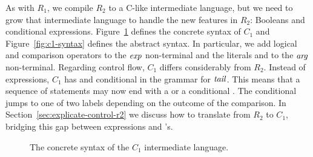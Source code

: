 \documentclass[11pt]{book}
\newcommand{\gray}[1]{{\color{lightgray} #1}}
\begin{document}
As with $R_1$, we compile $R_2$ to a C-like intermediate language, but
we need to grow that intermediate language to handle the new features
in $R_2$: Booleans and conditional expressions.
Figure~\ref{fig:c1-concrete-syntax} defines the concrete syntax of
$C_1$ and Figure~\ref{fig:c1-syntax} defines the abstract syntax.  In
particular, we add logical and comparison operators to the $\mathit{exp}$
non-terminal and the literals  and  to the $\mathit{arg}$
non-terminal.  Regarding control flow, $C_1$ differs considerably from
$R_2$.  Instead of  expressions, $C_1$ has  and
conditional  in the grammar for $\mathit{tail}$. This means that a
sequence of statements may now end with a  or a conditional
. The conditional  jumps to one of two labels
depending on the outcome of the comparison. In
Section~\ref{sec:explicate-control-r2} we discuss how to translate
from $R_2$ to $C_1$, bridging this gap between  expressions
and 's.

\begin{figure}[tbp]
\fbox{
\begin{minipage}{0.96\textwidth}
\small    
\[
\begin{array}{lcl}
\Atm &::=& \gray{ \Int \mid \Var } \mid \itm{bool} \\
\itm{cmp} &::= & \key{eq?} \mid \key{<}  \\
\Exp &::=& \gray{ \Atm \mid \key{(read)} \mid \key{(-}~\Atm\key{)} \mid \key{(+}~\Atm~\Atm\key{)} } \\
   &::=& \LP \key{not}~\Atm \RP \mid \LP \itm{cmp}~\Atm~\Atm\RP \\
\Stmt &::=& \gray{ \Var~\key{=}~\Exp\key{;} } \\
\Tail &::= & \gray{ \key{return}~\Exp\key{;} \mid \Stmt~\Tail } \\
   &\mid& \key{goto}~\itm{label}\key{;}\\
   &\mid& \key{if}~\LP \itm{cmp}~\Atm~\Atm \RP~ \key{goto}~\itm{label}\key{;} ~\key{else}~\key{goto}~\itm{label}\key{;} \\
C_1 & ::= & \gray{ (\itm{label}\key{:}~ \Tail)^{+} }
\end{array}
\]
\end{minipage}
}
\caption{The concrete syntax of the $C_1$ intermediate language.}
\label{fig:c1-concrete-syntax}
\end{figure}
\end{document}

